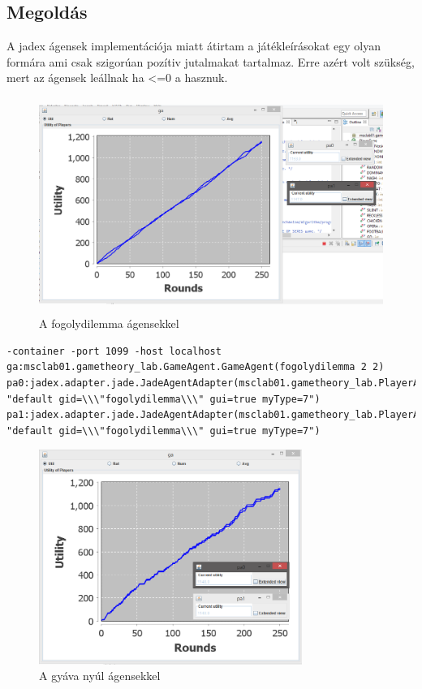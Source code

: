 \subsection{Megoldás}
A jadex ágensek implementációja miatt átirtam a játékleírásokat egy olyan formára ami csak szigorúan pozítiv jutalmakat tartalmaz. Erre azért volt szükség, mert az ágensek leállnak ha <=0 a hasznuk.


		\begin{figure}[h]
		\begin{center}
		\includegraphics[height=7cm]{figures/fogoly_jadex.png}
		\caption{A fogolydilemma ágensekkel}
		\end{center}
		\end{figure}

\begin{lstlisting}[caption=Fogolydilemma run config, frame=single,float=!ht]
-container -port 1099 -host localhost 
ga:msclab01.gametheory_lab.GameAgent.GameAgent(fogolydilemma 2 2) 
pa0:jadex.adapter.jade.JadeAgentAdapter(msclab01.gametheory_lab.PlayerAgent.Player 
"default gid=\\\"fogolydilemma\\\" gui=true myType=7") 
pa1:jadex.adapter.jade.JadeAgentAdapter(msclab01.gametheory_lab.PlayerAgent.Player 
"default gid=\\\"fogolydilemma\\\" gui=true myType=7")
\end{lstlisting}
		

		\begin{figure}[h]
		\begin{center}
		\includegraphics[height=7cm]{figures/nyul_jadex.png}
		\caption{A gyáva nyúl ágensekkel}
		\end{center}
		\end{figure}

